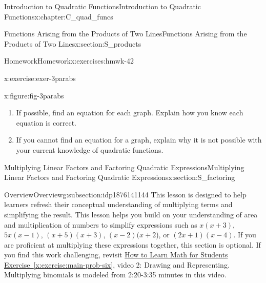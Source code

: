 \documentclass[oneside,10pt,]{book}
\newcommand{\xreffont}{\relax}
\numberwithin{equation}{chapter}
\begin{document}
\begin{chapterptx}{Introduction to Quadratic Functions}{}{Introduction to Quadratic Functions}{}{}{x:chapter:C_quad_funcs}
\begin{sectionptx}{Functions Arising from the Products of Two Lines}{}{Functions Arising from the Products of Two Lines}{}{}{x:section:S_products}
\begin{exercises-subsection}{Homework}{}{Homework}{}{}{x:exercises:hmwk-42}
\begin{divisionexercise}{8}{}{}{x:exercise:exer-3parabs}
\begin{figureptx}{}{x:figure:fig-3parabs}{}
\begin{image}{0.15}{0.7}{0.15}
\end{image}%
\tcblower
\end{figureptx}%
\begin{enumerate}[font=\bfseries,label=(\alph*),ref=\alph*]
\item{}If possible, find an equation for each graph. Explain how you know each equation is correct.%
\item{}If you cannot find an equation for a graph, explain why it is not possible with your current knowledge of quadratic functions.%
\end{enumerate}
\end{divisionexercise}%
\end{exercises-subsection}
\end{sectionptx}
%
%
\typeout{************************************************}
\typeout{************************************************}
%
\begin{sectionptx}{Multiplying Linear Factors and Factoring Quadratic Expressions}{}{Multiplying Linear Factors and Factoring Quadratic Expressions}{}{}{x:section:S_factoring}
%
%
\typeout{************************************************}
\typeout{************************************************}
%
\begin{subsectionptx}{Overview}{}{Overview}{}{}{g:subsection:idp1876141144}
This lesson is designed to help learners refresh their conceptual understanding of multiplying terms and simplifying the result. This lesson helps you build on your understanding of area and multiplication of numbers to simplify expressions such as \(x(x + 3)\), \(5x(x - 1)\), \((x + 5)(x + 3)\), \((x - 2)(x + 2\)), or \((2x + 1)(x - 4)\). If you are proficient at multiplying these expressions together, this section is optional. If you find this work challenging, revisit \hyperref[x:exercise:main-prob-six]{How to Learn Math for Students Exercise~{\xreffont\ref{x:exercise:main-prob-six}}}, video 2: Drawing and Representing. Multiplying binomials is modeled from 2:20-3:35 minutes in this video.%
\end{subsectionptx}
%
%
\typeout{************************************************}
\typeout{************************************************}
%

\end{sectionptx}
\end{chapterptx}
\end{document}
